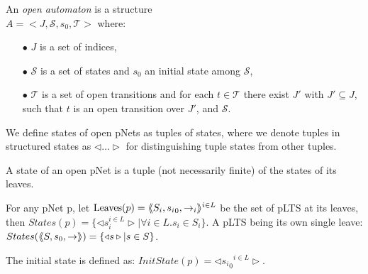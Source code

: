 \documentclass{lncs/llncs}
\begin{document}
\begin{definition}
	\label{def:open-automaton}
	An \emph{open automaton} is a structure\\ $A =
	<J,\mathcal{S},s_0,\mathcal{T}>$ where:
	\begin{itemize}
		\item[$\bullet$]   $J$ is a  set of indices,
		\item[$\bullet$]   $\mathcal{S}$ is a set of states and $s_0$ an initial state
		among $\mathcal{S}$,
		\item[$\bullet$] $\mathcal{T}$ is a set of open transitions and for each
		$t\in \mathcal{T}$ there exist  $J'$ with  $J'
		\subseteq J$, such that $t$ is an open transition over  $J'$,
		and  $\mathcal{S}$.
		
	\end{itemize}
\end{definition}
	

%

We define states of open pNets as tuples of states, where we denote tuples
in structured states as $\triangleleft\ldots\triangleright$ for distinguishing tuple 
states from other tuples.
\begin{definition}\label{def-states}
  A state of an open pNet is a tuple (not necessarily finite) of the
  states of its leaves.

  For any pNet p, let $\operatorname{Leaves}(p) = \langle\hspace{-0.58ex}\langle S_i,{s_i}_0, \to_i\rangle\hspace{-0.58ex}\rangle^{i \in L}$ be 
  the set of pLTS at its leaves,
  then $States(p) = \{\triangleleft s_i^{i\in L}
  \triangleright| \forall i\in L. s_i \in S_i\}$.
A pLTS being its own single leave:
  $States(\langle\hspace{-0.58ex}\langle S,s_0, \to\rangle\hspace{-0.58ex}\rangle) = \{\triangleleft s \triangleright| s \in S\}$.

The initial state is defined as:
$InitState(p) = \triangleleft {{s_i}_0}^{i\in L}  \triangleright$.
\end{definition}



\end{document}
